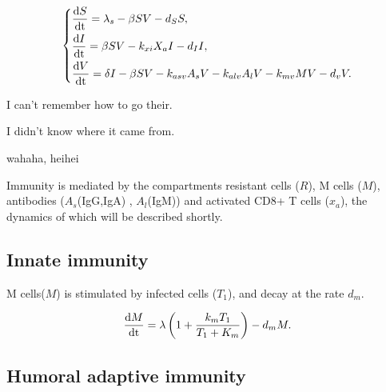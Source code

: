 \documentclass[preprint,11pt,sort&compress,square]{elsarticle}
\numberwithin{equation}{section}
\begin{document}
\begin{equation}\label{virusdynamics}
	\left\{
	\begin{aligned}
		 & \frac{{\rm d } S}{{\rm dt}}=\lambda_{s}-\beta S V-d_{S}S, \\
		 & \frac{{\rm d } I}{{\rm dt}}=\beta S V-k_{xi}X_{a}I-d_{I}I,                          \\
		 & \frac{{\rm d } V}{{\rm dt}}=\delta I-\beta SV-k_{asv}A_{s}V-k_{alv}A_{l}V-k_{mv}MV-d_{v}V.                          \\
	\end{aligned}
	\right.
\end{equation}

I can’t remember how to go their.

I didn’t know where it came from.

wahaha, heihei

Immunity is mediated by the compartments resistant cells ($R$), M cells ($M$), antibodies ($A_{s}$(IgG,IgA) , $A_{l}$(IgM)) and activated CD8+ T cells ($x_{a}$), the dynamics of which will be described shortly.

\subsection{Innate immunity}



M cells($M$) is stimulated by infected cells ($T_{1}$), and decay at the rate $d_{m}$.

\begin{equation}\label{innateimmunity}
	\begin{aligned}
		 & \frac{{\rm d } M}{{\rm dt}}=\lambda\left(1+\frac{k_{m}T_{1}}{T_{1}+K_{m}}\right)-d_{m}M.   \\
	\end{aligned}
\end{equation}

\subsection{Humoral adaptive immunity}
\end{document}
